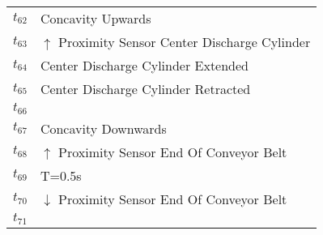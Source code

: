 \begin{table}[H]
\begin{tabular}{M{5cm}M{10cm}}
\hyperlink{partialNet:t62}{\hypertarget{partialTable:t62}{$t_{62}$}} & Concavity Upwards\\
\hyperlink{partialNet:t63}{\hypertarget{partialTable:t63}{$t_{63}$}} & \(\uparrow\) Proximity Sensor Center Discharge Cylinder\\
\hyperlink{partialNet:t64}{\hypertarget{partialTable:t64}{$t_{64}$}} & Center Discharge Cylinder Extended\\
\hyperlink{partialNet:t65}{\hypertarget{partialTable:t65}{$t_{65}$}} & Center Discharge Cylinder Retracted\\
\hyperlink{partialNet:t66}{\hypertarget{partialTable:t66}{$t_{66}$}} & \\
\hyperlink{partialNet:t67}{\hypertarget{partialTable:t67}{$t_{67}$}} & Concavity Downwards\\
\hyperlink{partialNet:t68}{\hypertarget{partialTable:t68}{$t_{68}$}} & \(\uparrow\) Proximity Sensor End Of Conveyor Belt\\
\hyperlink{partialNet:tt69}{\hypertarget{partialTable:tt69}{$t_{69}$}} & T=0.5s\\
\hyperlink{partialNet:t70}{\hypertarget{partialTable:t70}{$t_{70}$}} & \(\downarrow\) Proximity Sensor End Of Conveyor Belt\\
\hyperlink{partialNet:t71}{\hypertarget{partialTable:t71}{$t_{71}$}} & \\
\end{tabular}
\end{table}
